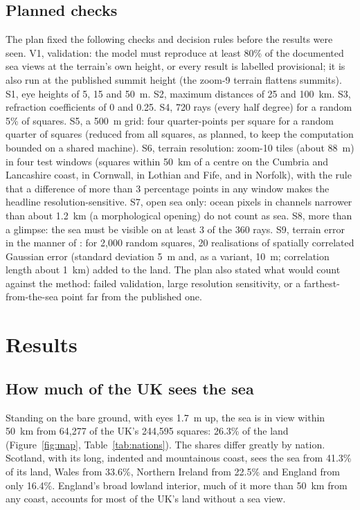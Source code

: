 \documentclass[11pt,a4paper]{article}
\begin{document}
\subsection{Planned checks}
The plan fixed the following checks and decision rules before the results were seen. V1, validation: the model must reproduce at least 80\% of the documented sea views at the terrain's own height, or every result is labelled provisional; it is also run at the published summit height (the zoom-9 terrain flattens summits). S1, eye heights of 5, 15 and 50~m. S2, maximum distances of 25 and 100~km. S3, refraction coefficients of 0 and 0.25. S4, 720 rays (every half degree) for a random 5\% of squares. S5, a 500~m grid: four quarter-points per square for a random quarter of squares (reduced from all squares, as planned, to keep the computation bounded on a shared machine). S6, terrain resolution: zoom-10 tiles (about 88~m) in four test windows (squares within 50~km of a centre on the Cumbria and Lancashire coast, in Cornwall, in Lothian and Fife, and in Norfolk), with the rule that a difference of more than 3 percentage points in any window makes the headline resolution-sensitive. S7, open sea only: ocean pixels in channels narrower than about 1.2~km (a morphological opening) do not count as sea. S8, more than a glimpse: the sea must be visible on at least 3 of the 360 rays. S9, terrain error in the manner of \citet{fisher1991,fisher1992}: for 2,000 random squares, 20 realisations of spatially correlated Gaussian error (standard deviation 5~m and, as a variant, 10~m; correlation length about 1~km) added to the land. The plan also stated what would count against the method: failed validation, large resolution sensitivity, or a farthest-from-the-sea point far from the published one.

\section{Results}\label{sec:results}
\subsection{How much of the UK sees the sea}
Standing on the bare ground, with eyes 1.7~m up, the sea is in view within 50~km from 64,277 of the UK's 244,595 squares: 26.3\% of the land (Figure~\ref{fig:map}, Table~\ref{tab:nations}). The shares differ greatly by nation. Scotland, with its long, indented and mountainous coast, sees the sea from 41.3\% of its land, Wales from 33.6\%, Northern Ireland from 22.5\% and England from only 16.4\%. England's broad lowland interior, much of it more than 50~km from any coast, accounts for most of the UK's land without a sea view.
\end{document}
